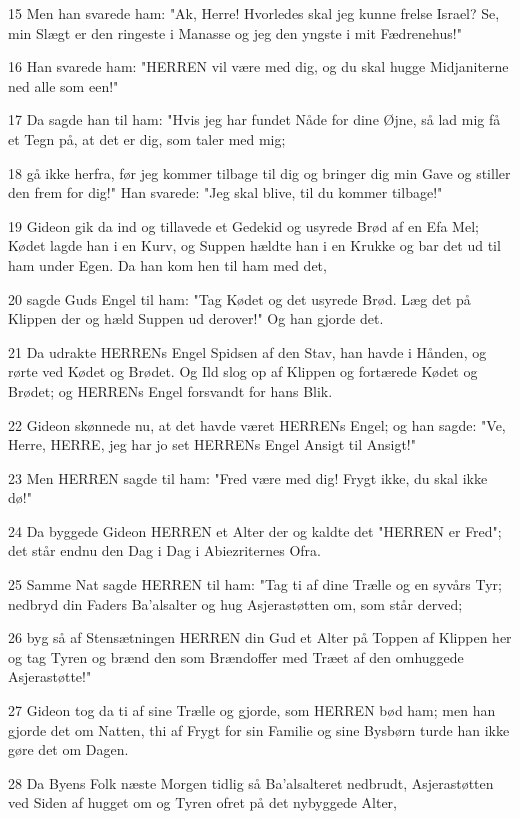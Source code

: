 \par 15 Men han svarede ham: "Ak, Herre! Hvorledes skal jeg kunne frelse Israel? Se, min Slægt er den ringeste i Manasse og jeg den yngste i mit Fædrenehus!"
\par 16 Han svarede ham: "HERREN vil være med dig, og du skal hugge Midjaniterne ned alle som een!"
\par 17 Da sagde han til ham: "Hvis jeg har fundet Nåde for dine Øjne, så lad mig få et Tegn på, at det er dig, som taler med mig;
\par 18 gå ikke herfra, før jeg kommer tilbage til dig og bringer dig min Gave og stiller den frem for dig!" Han svarede: "Jeg skal blive, til du kommer tilbage!"
\par 19 Gideon gik da ind og tillavede et Gedekid og usyrede Brød af en Efa Mel; Kødet lagde han i en Kurv, og Suppen hældte han i en Krukke og bar det ud til ham under Egen. Da han kom hen til ham med det,
\par 20 sagde Guds Engel til ham: "Tag Kødet og det usyrede Brød. Læg det på Klippen der og hæld Suppen ud derover!" Og han gjorde det.
\par 21 Da udrakte HERRENs Engel Spidsen af den Stav, han havde i Hånden, og rørte ved Kødet og Brødet. Og Ild slog op af Klippen og fortærede Kødet og Brødet; og HERRENs Engel forsvandt for hans Blik.
\par 22 Gideon skønnede nu, at det havde været HERRENs Engel; og han sagde: "Ve, Herre, HERRE, jeg har jo set HERRENs Engel Ansigt til Ansigt!"
\par 23 Men HERREN sagde til ham: "Fred være med dig! Frygt ikke, du skal ikke dø!"
\par 24 Da byggede Gideon HERREN et Alter der og kaldte det "HERREN er Fred"; det står endnu den Dag i Dag i Abiezriternes Ofra.
\par 25 Samme Nat sagde HERREN til ham: "Tag ti af dine Trælle og en syvårs Tyr; nedbryd din Faders Ba'alsalter og hug Asjerastøtten om, som står derved;
\par 26 byg så af Stensætningen HERREN din Gud et Alter på Toppen af Klippen her og tag Tyren og brænd den som Brændoffer med Træet af den omhuggede Asjerastøtte!"
\par 27 Gideon tog da ti af sine Trælle og gjorde, som HERREN bød ham; men han gjorde det om Natten, thi af Frygt for sin Familie og sine Bysbørn turde han ikke gøre det om Dagen.
\par 28 Da Byens Folk næste Morgen tidlig så Ba'alsalteret nedbrudt, Asjerastøtten ved Siden af hugget om og Tyren ofret på det nybyggede Alter,
